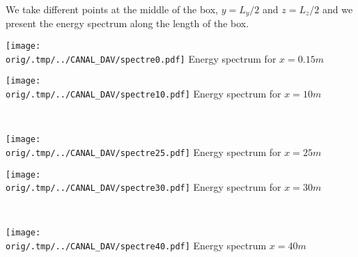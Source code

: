 We take different points at the middle of the box, $y = L_y/2$ and $z = L_z/2$ and we present the energy spectrum along the length of the box.\\
\begin{minipage}{0.4\textwidth}
		\centering
        \texttt{[image: \\orig/.tmp/../CANAL\_DAV/spectre0.pdf]}
	Energy spectrum for $x = 0.15m$
\end{minipage}
\begin{minipage}{0.4\textwidth}
		\centering
        \texttt{[image: \\orig/.tmp/../CANAL\_DAV/spectre10.pdf]}
	Energy spectrum for $x = 10m$
\end{minipage}\\
\begin{minipage}{0.4\textwidth}
		\centering
       	\texttt{[image: \\orig/.tmp/../CANAL\_DAV/spectre25.pdf]}
Energy spectrum for $x = 25m$
\end{minipage}
\begin{minipage}{0.4\textwidth}
		\centering
        \texttt{[image: \\orig/.tmp/../CANAL\_DAV/spectre30.pdf]}
Energy spectrum for $x = 30m$
\end{minipage}\\
\begin{minipage}{0.4\textwidth}
		\centering
        \texttt{[image: \\orig/.tmp/../CANAL\_DAV/spectre40.pdf]}
Energy spectrum $x = 40m$
\end{minipage}

